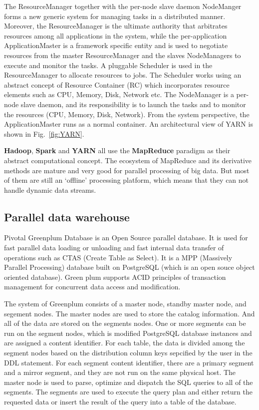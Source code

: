 \documentclass[	DIV=calc,%
							paper=a4,%
							fontsize=11pt,%
							twocolumn]{scrartcl}	 					%
\begin{document}
The ResourceManager together with the per-node slave daemon NodeManger forms a new generic system for managing tasks in a distributed manner. Moreover, the ResourceManager is the ultimate authority that arbitrates resources among all applications in the system, while the per-application ApplicationMaster is a framework specific entity and is used to negotiate resources from the master ResourceManager and the slaves NodeManagers to execute and monitor the tasks. A pluggable Scheduler is used in the ResourceManager to allocate resources to jobs. The Scheduler works using an abstract concept of Resource Container (RC) which incorporates resource elements such as CPU, Memory, Disk, Network etc. The NodeManager is a per-node slave daemon, and its responsibility is to launch the tasks and to monitor the resources (CPU, Memory, Disk, Network). From the system perspective, the ApplicationMaster runs as a normal container.
An architectural view of YARN is shown in Fig.~\ref{fig:YARN}.

\textbf{Hadoop}, \textbf{Spark} and \textbf{YARN} all use the \textbf{MapReduce} paradigm as their abstract computational concept. The ecosystem of MapReduce and its derivative methods are mature and very good for parallel processing of big data. But most of them are still an `offline' processing platform, which means that they can not handle dynamic data streams.



\subsection*{Parallel data warehouse}
Pivotal Greenplum Database \cite{Greenplum} is an Open Source parallel database. It is used for fast parallel data loading or unloading and fast internal data transfer of operations such as CTAS (Create Table as Select). It is a MPP (Massively Parallel Processing) database built on PostgreSQL (which is an open souce object oriented database). Green plum supports ACID principles of transaction management for concurrent data access and modification. 

The system of Greenplum consists of a master node, standby master node, and segement nodes.  The master nodes are used to store the catalog information. And all of the data are stored on the segments nodes. One or more segments can be run on the segment nodes, which is modified PostgreSQL database instances and are assigned a content identifier. For each table, the data is divided among the segment nodes based on the distribution column keys sepcified by the user in the DDL statement. For each segment content identifier, there are a primary segment and a mirror segment, and they are not run on the same physical host.  The master node is used to parse, optimize and dispatch the SQL queries to all of the segments. The segments are used to execute the query plan and either return the requested data or insert the result of the query into a table of the database.
\end{document}
